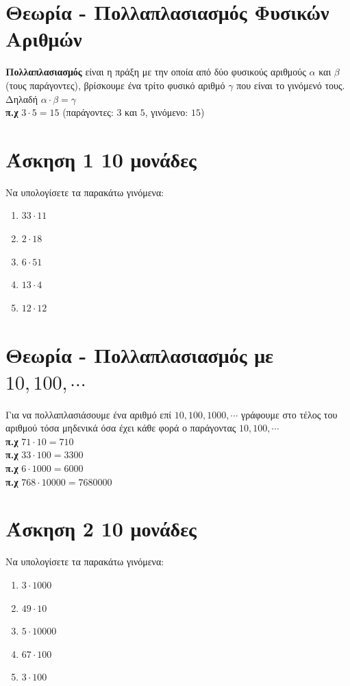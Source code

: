 \documentclass[a4paper,10pt]{report}
\begin{document}
\section*{Θεωρία - Πολλαπλασιασμός Φυσικών Αριθμών \hfill \small{}}
\textbf{Πολλαπλασιασμός} είναι η πράξη με την οποία από δύο φυσικούς αριθμούς $α$ και $β$ (τους παράγοντες), 
βρίσκουμε ένα τρίτο φυσικό αριθμό $γ$ που είναι το γινόμενό τους. Δηλαδή $α\cdot β=γ$\\
\textbf{π.χ} $3\cdot 5 =15$ (παράγοντες: $3$ και $5$, γινόμενο: $15$)

\section*{Άσκηση 1  \hfill \small{10 μονάδες}}
Να υπολογίσετε τα παρακάτω γινόμενα: 
\begin{enumerate} [1)]
 \item $33\cdot 11$
 \item $2\cdot 18$
 \item $6\cdot 51$
 \item $13\cdot 4$
 \item $12\cdot 12$
\end{enumerate}

\section*{Θεωρία - Πολλαπλασιασμός με $10,100,\cdots$ \hfill \small{}}
Για να πολλαπλασιάσουμε ένα αριθμό επί $10,100,1000,\cdots$ γράφουμε στο τέλος του αριθμού τόσα μηδενικά όσα έχει 
κάθε φορά ο παράγοντας $10,100,\cdots$ \\
\textbf{π.χ} $71\cdot10=710$\\
\textbf{π.χ} $33\cdot100=3300$\\
\textbf{π.χ} $6\cdot1000=6000$\\
\textbf{π.χ} $768\cdot10000=7680000$

\section*{Άσκηση 2  \hfill \small{10 μονάδες}}
Να υπολογίσετε τα παρακάτω γινόμενα: 
\begin{enumerate} [1)]
 \item $3\cdot 1000$
 \item $49\cdot 10$
 \item $5\cdot 10000$
 \item $67\cdot 100$
 \item $3\cdot 100$
\end{enumerate}
\end{document}

